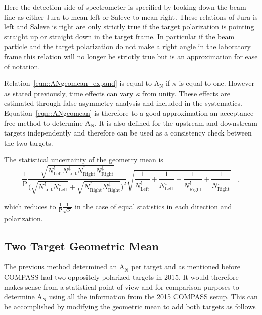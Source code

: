 \noindent
Here the detection side of spectrometer is specified by looking down the beam
line as either Jura to mean left or Saleve to mean right.  These relations of
Jura is left and Saleve is right are only strictly true if the target
polarization is pointing straight up or straight down in the target frame.  In
particular if the beam particle and the target polarization do not make a right
angle in the laboratory frame this relation will no longer be strictly true but
is an approximation for ease of notation.

Relation~\ref{eqn::ANgeomean_expand} is equal to A$_{\mathrm{N}}$ if $\kappa$ is
equal to one.  However as stated previously, time effects can vary $\kappa$ from
unity. These effects are estimated through false asymmetry analysis and included
in the systematics.  Equation~\ref{eqn::ANgeomean} is therefore to a good
approximation an acceptance free method to determine A$_{\mathrm{N}}$.  It is
also defined for the upstream and downstream targets independently and therefore
can be used as a consistency check between the two targets.

The statistical uncertainty of the geometry mean is
\begin{equation}
  \frac{1}{\mathrm{P}}
  \frac{
    \sqrt{
      N_{\mathrm{Left}}^{\uparrow}N_{\mathrm{Left}}^{\downarrow}
      N_{\mathrm{ Right}}^{\uparrow}N_{\mathrm{Right}}^{\downarrow}
    }
  }{
    \Big( \sqrt{N_{\mathrm{Left}}^{\uparrow}N_{\mathrm{Left}}^{\downarrow}} +
    \sqrt{N_{\mathrm{Right}}^{\uparrow}N_{\mathrm{Right}}^{\downarrow}} \Big)^2
  }
  \sqrt{
    \frac{1}{N_{\mathrm{Left}}^{\uparrow}} +
    \frac{1}{N_{\mathrm{Left}}^{\downarrow}} +
    \frac{1}{N_{\mathrm{Right}}^{\uparrow}} +
    \frac{1}{N_{\mathrm{Right}}^{\downarrow}}
  } \quad,
\end{equation}

\noindent
which reduces to $\frac{1}{\mathrm{P}}\frac{1}{\sqrt{\mathrm{N}}}$ in the case
of equal statistics in each direction and polarization.

\subsection{Two Target Geometric Mean} \label{sec::TwoTargGeoMean}
The previous method determined an A$_{\mathrm{N}}$ per target and as mentioned
before COMPASS had two oppositely polarized targets in 2015.  It would therefore
makes sense from a statistical point of view and for comparison purposes to
determine A$_{\mathrm{N}}$ using all the information from the 2015 COMPASS
setup.  This can be accomplished by modifying the geometric mean to add both
targets as follows

